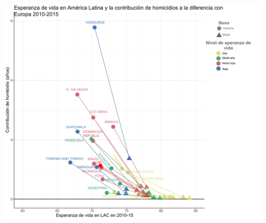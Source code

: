 \documentclass[xcolor={dvipsnames}]{beamer}
\begin{document}
\begin{frame}
\Large{
				\begin{center}
\includegraphics[scale=.31]{Figures/Fig2_V4}
				\end{center}				
}
\end{frame}




\end{document}
